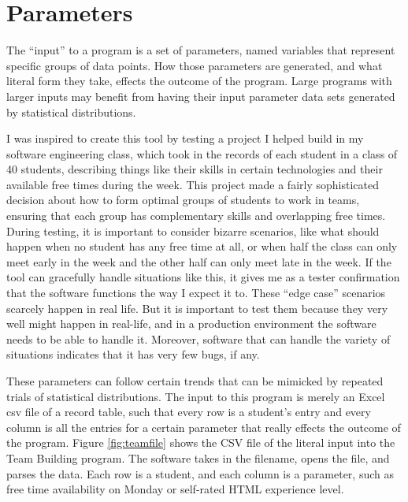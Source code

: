 \section{Parameters}
The ``input'' to a program is a set of parameters, named variables that represent specific groups of data points. How those parameters are generated, and what literal form they take, effects the outcome of the program. Large programs with larger inputs may benefit from having their input parameter data sets generated by statistical distributions.

I was inspired to create this tool by testing a project I helped build in my software engineering class, which took in the records of each student in a class of 40 students, describing things like their skills in certain technologies and their available free times during the week. This project made a fairly sophisticated decision about how to form optimal groups of students to work in teams, ensuring that each group has complementary skills and overlapping free times. During testing, it is important to consider bizarre scenarios, like what should happen when no student has any free time at all, or when half the class can only meet early in the week and the other half can only meet late in the week. If the tool can gracefully handle situations like this, it gives me as a tester confirmation that the software functions the way I expect it to. These ``edge case'' scenarios scarcely happen in real life. But it is important to test them because they very well might happen in real-life, and in a production environment the software needs to be able to handle it. Moreover, software that can handle the variety of situations indicates that it has very few bugs, if any.

These parameters can follow certain trends that can be mimicked by repeated trials of statistical distributions. The input to this program is merely an Excel csv file of a record table, such that every row is a student's entry and every column is all the entries for a certain parameter that really effects the outcome of the program. Figure \ref{fig:teamfile} shows the CSV file of the literal input into the Team Building program. The software takes in the filename, opens the file, and parses the data. Each row is a student, and each column is a parameter, such as free time availability on Monday or self-rated HTML experience level.

